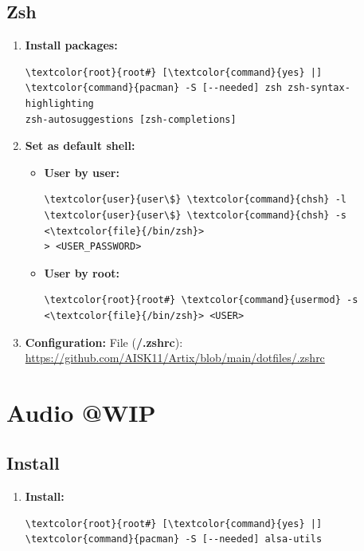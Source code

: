 \documentclass[10pt, a4paper, onecolumn, oneside, titlepage, openany]{book}
\begin{document}
\section{Zsh}
\begin{enumerate}
    \item \textbf{Install packages:}
\begin{Verbatim}[commandchars=\\\{\}]
\textcolor{root}{root#} [\textcolor{command}{yes} |] \textcolor{command}{pacman} -S [--needed] zsh zsh-syntax-highlighting 
zsh-autosuggestions [zsh-completions]
\end{Verbatim}
    \item \textbf{Set as default shell:}
    \begin{itemize}
        \item \textbf{User by user:}
\begin{Verbatim}[commandchars=\\\{\}]
\textcolor{user}{user\$} \textcolor{command}{chsh} -l
\textcolor{user}{user\$} \textcolor{command}{chsh} -s <\textcolor{file}{/bin/zsh}>
> <USER_PASSWORD>
\end{Verbatim}        
        \item \textbf{User by root:}
\begin{Verbatim}[commandchars=\\\{\}]
\textcolor{root}{root#} \textcolor{command}{usermod} -s <\textcolor{file}{/bin/zsh}> <USER>
\end{Verbatim}
    \end{itemize}
    \item \textbf{Configuration:}
\newline File (\textbf{\textcolor{file}{\texttildelow/.zshrc}}):
\newline \url{https://github.com/AISK11/Artix/blob/main/dotfiles/.zshrc}
\end{enumerate}




\chapter{Audio @WIP}
\section{Install}
\begin{enumerate}
    \item \textbf{Install:}
\begin{Verbatim}[commandchars=\\\{\}]
\textcolor{root}{root#} [\textcolor{command}{yes} |] \textcolor{command}{pacman} -S [--needed] alsa-utils
\end{Verbatim}
\end{enumerate}
\end{document}
